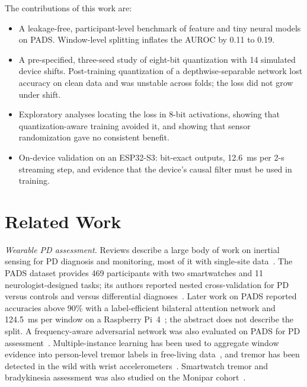 \documentclass[journal,twoside,web]{ieeecolor}
\begin{document}
The contributions of this work are:
\begin{itemize}
  \item A leakage-free, participant-level benchmark of feature and tiny neural models on PADS. Window-level splitting inflates the AUROC by 0.11 to 0.19.
  \item A pre-specified, three-seed study of eight-bit quantization with 14 simulated device shifts. Post-training quantization of a depthwise-separable network lost accuracy on clean data and was unstable across folds; the loss did not grow under shift.
  \item Exploratory analyses locating the loss in 8-bit activations, showing that quantization-aware training avoided it, and showing that sensor randomization gave no consistent benefit.
  \item On-device validation on an ESP32-S3: bit-exact outputs, 12.6~ms per 2-s streaming step, and evidence that the device's causal filter must be used in training.
\end{itemize}

\section{Related Work}
\emph{Wearable PD assessment.} Reviews describe a large body of work on inertial sensing for PD diagnosis and monitoring, most of it with single-site data~\cite{Rovini2017,Sigcha2023rev}. The PADS dataset provides 469 participants with two smartwatches and 11 neurologist-designed tasks; its authors reported nested cross-validation for PD versus controls and versus differential diagnoses~\cite{Varghese2024}. Later work on PADS reported accuracies above 90\% with a label-efficient bilateral attention network and 124.5~ms per window on a Raspberry Pi~4~\cite{Zannat2026}; the abstract does not describe the split. A frequency-aware adversarial network was also evaluated on PADS for PD assessment~\cite{Zhao2025MFAM}. Multiple-instance learning has been used to aggregate window evidence into person-level tremor labels in free-living data~\cite{Papadopoulos2023,Ilse2018}, and tremor has been detected in the wild with wrist accelerometers~\cite{SanSegundo2020}. Smartwatch tremor and bradykinesia assessment was also studied on the Monipar cohort~\cite{Sigcha2021,Monipar2023}.
\end{document}
